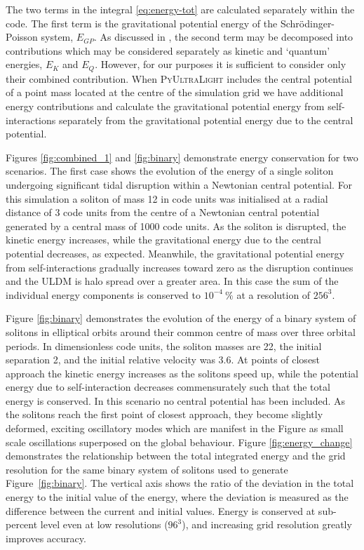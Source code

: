 \documentclass[a4paper,11pt]{article}
\newcommand{\PyUltraLight}{\textsc{PyUltraLight}\xspace}
\begin{document}
The two terms in the integral \ref{eq:energy-tot} are calculated separately within the code. The first term is the gravitational potential energy of the Schr{\"o}dinger-Poisson system, $E_{GP}$. As discussed in \cite{Hui2016}, the second term may be decomposed into contributions which may be considered separately as kinetic and `quantum' energies, $E_K$ and $E_Q$. However, for our purposes it is sufficient to consider only their combined contribution. When \PyUltraLight includes the central potential of a point mass located at the centre of the simulation grid we have additional energy contributions and calculate the  gravitational potential energy from self-interactions separately from the gravitational potential energy due to the central potential.

Figures \ref{fig:combined_1} and \ref{fig:binary} demonstrate energy conservation for two scenarios. The first case  shows the evolution of the energy of a single soliton undergoing significant tidal disruption within a Newtonian central potential. For this simulation a soliton of mass 12 in code units was initialised at a radial distance of 3 code units from the centre of a Newtonian central potential generated by a central mass of 1000 code units. As the soliton is disrupted, the kinetic energy increases, while the gravitational energy due to the central potential decreases, as expected. Meanwhile, the gravitational potential energy from self-interactions gradually increases toward zero as the disruption continues and the ULDM is halo spread over a greater area. In this case the sum of the individual energy components is conserved to $10^{-4}\ \%$  at a resolution of $256^3$.

Figure \ref{fig:binary} demonstrates the evolution of the energy of a binary system of solitons in elliptical orbits around their common centre of mass over three orbital periods. In dimensionless code units, the soliton masses are 22, the initial separation  2, and the initial relative velocity was 3.6. At points of closest approach the kinetic energy increases as the solitons speed up, while the potential energy due to self-interaction decreases commensurately such that the total energy is conserved. In this scenario no central potential has been included. As the solitons reach the first point of closest approach, they become slightly deformed, exciting oscillatory modes which are manifest in the Figure as small scale oscillations superposed on the global behaviour. Figure \ref{fig:energy_change} demonstrates the relationship between the total integrated energy and the grid resolution for the same binary system of solitons used to generate Figure~\ref{fig:binary}. The vertical axis shows the ratio of the deviation in the total energy to the initial value of the energy, where the deviation is measured as the difference between the current and initial values. Energy is conserved at sub-percent level even at low resolutions ($96^3$), and increasing grid resolution greatly improves accuracy.
\end{document}
